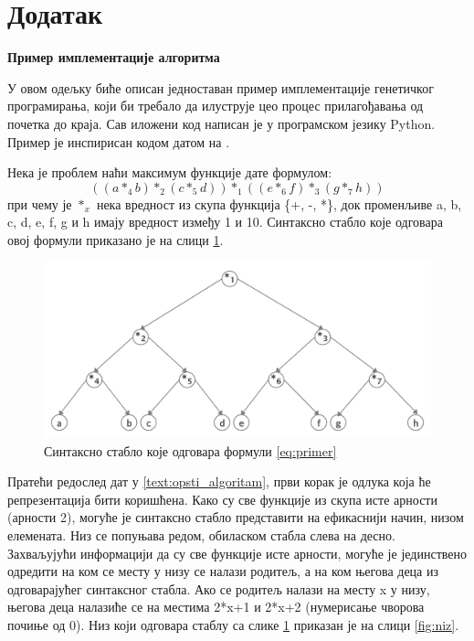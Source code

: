 \documentclass[a4paper]{article}
\begin{document}
\appendix
 


\appendix
\section{Додатак}

\bigskip
\noindent
\textbf{\large Пример имплементације алгоритма}\newline
\label{implementacija}

У овом одељку биће описан једноставан пример имплементације генетичког програмирања, који би требало да илуструје цео процес прилагођавања од почетка до краја. Сав иложени код написан је у програмском језику Python. Пример је инспирисан кодом датом на \cite{ri}. \newline

Нека је проблем наћи максимум функције дате формулом:
\begin{equation} 
    \label{eq:primer}
    ((a *_4 b) *_2 (c *_5 d)) *_1 ((e *_6 f) *_3 (g *_7 h))
\end{equation}
при чему је $*_x$ нека вредност из скупа функција \{+, -, *\}, док променљиве a, b, c, d, e, f, g и h имају вредност између 1 и 10. Синтаксно стабло које одговара овој формули приказано је на слици \ref{fig:stablo}. \newline

\begin{figure}[ht!]
    \begin{center}
    \includegraphics[scale=0.14]{stablo_primera.png}
    \end{center}
    \caption{Синтаксно стабло које одговара формули \eqref{eq:primer}}
    \label{fig:stablo}
\end{figure}

Пратећи редослед дат у \ref{text:opsti_algoritam}, први корак је одлука која ће репрезентација бити коришћена. Како су све функције из скупа исте арности (арности 2), могуће је синтаксно стабло представити на ефикаснији начин, низом елемената. Низ се попуњава редом,  обиласком стабла слева на десно. Захваљујући информацији да су све функције исте арности, могуће је јединствено одредити на ком се месту у низу се налази родитељ, а на ком његова деца из одговарајућег синтаксног стабла. Ако се родитељ налази на месту x у низу, његова деца налазиће се на местима 2*x+1 и 2*x+2 (нумерисање чворова почиње од 0). Низ који одговара стаблу са слике \ref{fig:stablo} приказан је на слици \ref{fig:niz}. \newline
\end{document}
